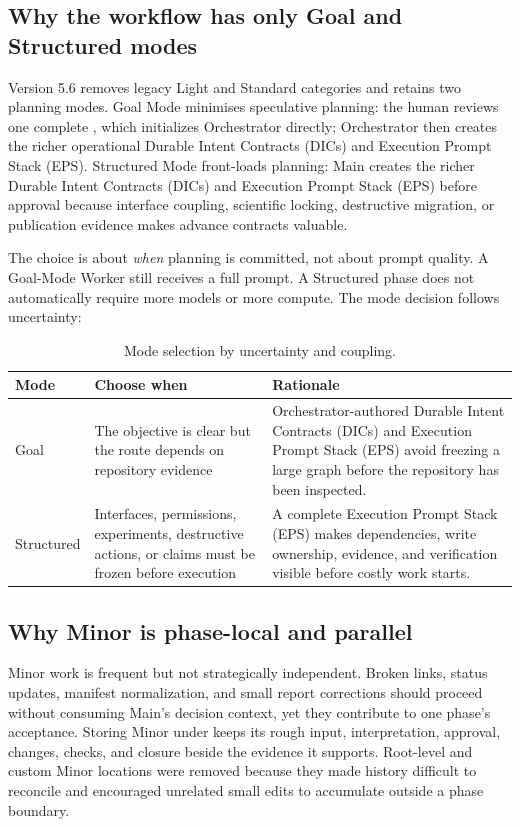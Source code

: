\documentclass[11pt,a4paper]{article}
\newcommand{\code}[1]{\texttt{\detokenize{#1}}}
\begin{document}
\subsection{Why the workflow has only Goal and Structured modes}

Version 5.6 removes legacy Light and Standard categories and retains two planning modes. Goal Mode minimises speculative planning: the human reviews one complete \code{GOAL.md}, which initializes Orchestrator directly; Orchestrator then creates the richer operational Durable Intent Contracts (DICs) and Execution Prompt Stack (EPS). Structured Mode front-loads planning: Main creates the richer Durable Intent Contracts (DICs) and Execution Prompt Stack (EPS) before approval because interface coupling, scientific locking, destructive migration, or publication evidence makes advance contracts valuable.

The choice is about \emph{when} planning is committed, not about prompt quality. A Goal-Mode Worker still receives a full prompt. A Structured phase does not automatically require more models or more compute. The mode decision follows uncertainty:

\begin{table}[H]
\centering
\caption{Mode selection by uncertainty and coupling.}
\begin{tabularx}{\textwidth}{P{0.18\textwidth}P{0.25\textwidth}Y}
\toprule
\textbf{Mode} & \textbf{Choose when} & \textbf{Rationale} \\
\midrule
Goal & The objective is clear but the route depends on repository evidence & Orchestrator-authored Durable Intent Contracts (DICs) and Execution Prompt Stack (EPS) avoid freezing a large graph before the repository has been inspected. \\
Structured & Interfaces, permissions, experiments, destructive actions, or claims must be frozen before execution & A complete Execution Prompt Stack (EPS) makes dependencies, write ownership, evidence, and verification visible before costly work starts. \\
\bottomrule
\end{tabularx}
\end{table}

\subsection{Why Minor is phase-local and parallel}

Minor work is frequent but not strategically independent. Broken links, status updates, manifest normalization, and small report corrections should proceed without consuming Main's decision context, yet they contribute to one phase's acceptance. Storing Minor under  keeps its rough input, interpretation, approval, changes, checks, and closure beside the evidence it supports. Root-level and custom Minor locations were removed because they made history difficult to reconcile and encouraged unrelated small edits to accumulate outside a phase boundary.
\end{document}
